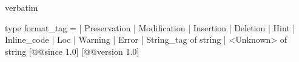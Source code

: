 \begin{camlexample}{verbatim}
\begin{caml}
\begin{camlinput}
type format_tag =
  | Preservation
  | Modification
  | Insertion
  | Deletion
  | Hint
  | Inline_code
  | Loc
  | Warning
  | Error
  | String_tag of string
  | <Unknown> of string
[@@since 1.0] [@@version 1.0]
\end{camlinput}
\end{caml}
\end{camlexample}
